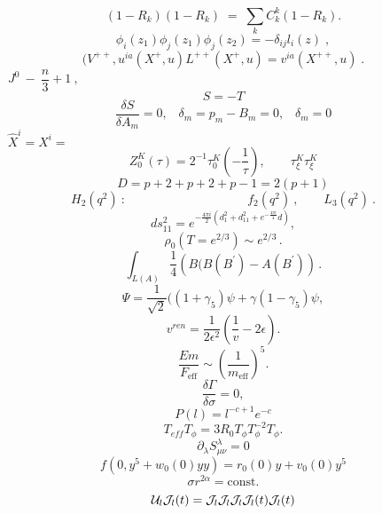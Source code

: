 \documentclass{article}
\begin{document}
$$( 1 - R _ { k } ) ( 1 - R _ { k } ) \; = \; \sum _ { k } C _ { k } ^ { k } ( 1 - R _ { k } ) .$$
$$\phi _ { i } ( z _ { 1 } ) \phi _ { j } ( z _ { 1 } ) \phi _ { j } ( z _ { 2 } ) = - \delta _ { i j } l _ { i } ( z ) \; ,$$
$$( V ^ { + + } , u ^ { i a } ( X ^ { + } , u ) L ^ { + + } ( X ^ { + } , u ) = v ^ { i a } ( X ^ { + + } , u ) \; .$$
$$J ^ { 0 } \ - \ \frac { n } { 3 } + 1 \ , \ \ \ \ \ \ \ \ \ \ \ \ \ \ \ \ \ \ \ \ \ \ \ \ \ \ \ \ \ \ \ \ \ \ \ \ \ \ \ \ \ \ \ \ \ \ \ \ \ \ \ \ \ \ \ \ \ \ \ \ \ \ \ \ \ \ \ \ \ \ \ \ \ \ \ \ \ \ \ \ \ \ \ \ \ \ \ \ \ \ \ \ \ \ \ \ \ \ \ \ \ \ \ \ \ \ \ \ \ \ \ \ \ \ \ \ \ \ \ \ \ \ \ \ \ \ \ \ \ \ \ $$
$$S = - T$$
$$\frac { \delta S } { \delta A _ { m } } = 0 , \; \; \; \delta _ { m } = p _ { m } - B _ { m } = 0 , \; \; \; \delta _ { m } = 0$$
$$\hat { X } ^ { i } = X ^ { i } = \ \ \ \ \ \ \ \ \ \ \ \ \ \ \ \ \ \ \ \ \ \ \ \ \ \ \ \ \ \ \ \ \ \ \ \ \ \ \ \ \ \ \ \ \ \ \ \ \ \ \ \ \ \ \ \ \ \ \ \ \ \ \ \ \ \ \ \ \ \ \ \ \ \ \ \ \ \ \ \ \ \ \ \ \ \ \ \ \ \ \ \ \ \ \ \ \ \ \ \ \ \ \ \ \ \ \ \ \ \ \ \ \ \ \ \ \ \ \ \ \ \ \ \ \ \ \ \ \ \ \ \ \ \ \ $$
$$Z _ { 0 } ^ { K } ( \tau ) = 2 ^ { - 1 } \tau _ { 0 } ^ { K } ( - \frac { 1 } { \tau } ) , \qquad \tau _ { \xi } ^ { K } \tau _ { \xi } ^ { K }$$
$$D = p + 2 + p + 2 + p - 1 = 2 ( p + 1 )$$
$$H _ { 2 } ( q ^ { 2 } ) \ : \ \ \ \ \ \ \ \ \ \ \ \ \ \ \ \ \ \ \ \ \ \ \ \ \ \ \ \ \ \ \ \ \ \ \ \ \ \ \ \ \ \ \ \ f _ { 2 } ( q ^ { 2 } ) \ , \ \ \ \ \ \ \ \ \ L _ { 3 } ( q ^ { 2 } ) \ .$$
$$d s _ { 1 1 } ^ { 2 } = e ^ { - \frac { 4 \pi i } { 2 } ( d _ { 1 } ^ { 2 } + d _ { 1 1 } ^ { 2 } + e ^ { - \frac { 4 \pi i } { 4 } } d ) } ,$$
$$\rho _ { 0 } \left ( T = e ^ { 2 / 3 } \right ) \sim e ^ { 2 / 3 } \, .$$
$$\int _ { L ( A ) } \frac { 1 } { 4 } \left ( B ( B ( B ^ { \prime } ) - A ( B ^ { \prime } ) \right ) \, .$$
$$\Psi = \frac { 1 } { \sqrt { 2 } } \Big ( ( 1 + \gamma _ { 5 } ) \psi + \gamma ( 1 - \gamma _ { 5 } ) \psi ,$$
$$v ^ { r e n } = \frac { 1 } { 2 \epsilon ^ { 2 } } \left ( \frac { 1 } { v } - 2 \epsilon \right ) .$$
$$\frac { E m } { F _ { \mathrm { e f f } } } \sim \left ( \frac { 1 } { m _ { \mathrm { e f f } } } \right ) ^ { 5 } .$$
$$\frac { \delta \Gamma } { \delta \sigma } = 0 ,$$
$$P ( l ) = l ^ { - c + 1 } e ^ { - c }$$
$$T _ { e f f } T _ { \phi } = 3 R _ { 0 } T _ { \phi } T _ { \phi } ^ { - 2 } T _ { \phi } .$$
$$\partial _ { \lambda } S _ { \mu \nu } ^ { \lambda } = 0$$
$$f ( 0 , y ^ { 5 } + w _ { 0 } ( 0 ) y y ) = r _ { 0 } ( 0 ) y + v _ { 0 } ( 0 ) y ^ { 5 }$$
$$\sigma r ^ { 2 \alpha } = \mathrm { c o n s t } .$$
$${ \cal U } _ { l } { \cal J } _ { l } ( t ) = { \cal J } _ { l } { \cal J } _ { l } { \cal J } _ { l } { \cal J } _ { l } ( t ) { \cal J } _ { l } ( t )$$
\end{document}
